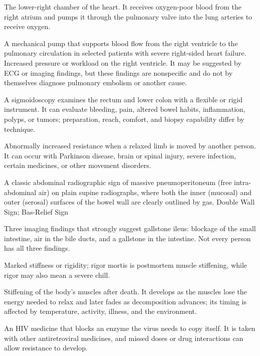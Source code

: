 The lower-right chamber of the heart. It receives oxygen-poor blood from the right atrium and pumps it through the pulmonary valve into the lung arteries to receive oxygen.

 A mechanical pump that supports blood flow from the right ventricle to the pulmonary circulation in selected patients with severe right-sided heart failure.
 Increased pressure or workload on the right ventricle. It may be suggested by ECG or imaging findings, but these findings are nonspecific and do not by themselves diagnose pulmonary embolism or another cause.

 A sigmoidoscopy examines the rectum and lower colon with a flexible or rigid instrument. It can evaluate bleeding, pain, altered bowel habits, inflammation, polyps, or tumors; preparation, reach, comfort, and biopsy capability differ by technique.

 Abnormally increased resistance when a relaxed limb is moved by another person. It can occur with Parkinson disease, brain or spinal injury, severe infection, certain medicines, or other movement disorders.

 A classic abdominal radiographic sign of massive pneumoperitoneum (free intra-abdominal air) on plain supine radiographs, where both the inner (mucosal) and outer (serosal) surfaces of the bowel wall are clearly outlined by gas.
\synonyms
Double Wall Sign; Bas-Relief Sign

 Three imaging findings that strongly suggest gallstone ileus: blockage of the small intestine, air in the bile ducts, and a gallstone in the intestine. Not every person has all three findings.

 Marked stiffness or rigidity; rigor mortis is postmortem muscle stiffening, while rigor may also mean a severe chill.

 Stiffening of the body’s muscles after death. It develops as the muscles lose the energy needed to relax and later fades as decomposition advances; its timing is affected by temperature, activity, illness, and the environment.

 An HIV medicine that blocks an enzyme the virus needs to copy itself. It is taken with other antiretroviral medicines, and missed doses or drug interactions can allow resistance to develop.

